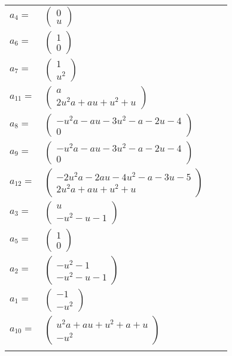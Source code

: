 \documentclass[1p]{elsarticle_modified}
\theoremstyle{definition}
\begin{document}
\begin{tabular}{m{7pt} m{180pt} m{7pt} m{180pt} }
\flushright $a_{4}=$&$\begin{pmatrix}0\\u\end{pmatrix}$ \\
\flushright $a_{6}=$&$\begin{pmatrix}1\\0\end{pmatrix}$ \\
\flushright $a_{7}=$&$\begin{pmatrix}1\\u^2\end{pmatrix}$ \\
\flushright $a_{11}=$&$\begin{pmatrix}a\\2 u^2 a+a u+u^2+u\end{pmatrix}$ \\
\flushright $a_{8}=$&$\begin{pmatrix}- u^2 a- a u-3 u^2- a-2 u-4\\0\end{pmatrix}$ \\
\flushright $a_{9}=$&$\begin{pmatrix}- u^2 a- a u-3 u^2- a-2 u-4\\0\end{pmatrix}$ \\
\flushright $a_{12}=$&$\begin{pmatrix}-2 u^2 a-2 a u-4 u^2- a-3 u-5\\2 u^2 a+a u+u^2+u\end{pmatrix}$ \\
\flushright $a_{3}=$&$\begin{pmatrix}u\\- u^2- u-1\end{pmatrix}$ \\
\flushright $a_{5}=$&$\begin{pmatrix}1\\0\end{pmatrix}$ \\
\flushright $a_{2}=$&$\begin{pmatrix}- u^2-1\\- u^2- u-1\end{pmatrix}$ \\
\flushright $a_{1}=$&$\begin{pmatrix}-1\\- u^2\end{pmatrix}$ \\
\flushright $a_{10}=$&$\begin{pmatrix}u^2 a+a u+u^2+a+u\\- u^2\end{pmatrix}$\\&\end{tabular}
\end{document}
